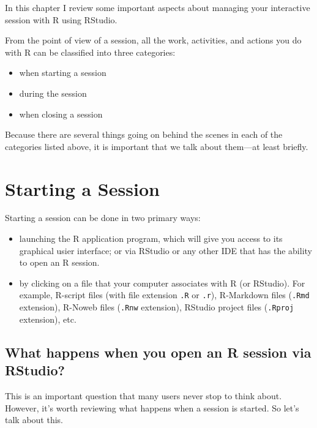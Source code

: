 \documentclass[
]{book}
\begin{document}
In this chapter I review some important aspects about managing your
interactive session with R using RStudio.

From the point of view of a session, all the work, activities, and actions you
do with R can be classified into three categories:

\begin{itemize}
\item
  when starting a session
\item
  during the session
\item
  when closing a session
\end{itemize}

Because there are several things going on behind the scenes in each of the
categories listed above, it is important that we talk about them---at least
briefly.

\hypertarget{starting-a-session}{%
\section{Starting a Session}\label{starting-a-session}}

Starting a session can be done in two primary ways:

\begin{itemize}
\item
  launching the R application program, which will give you access to its
  graphical usier interface; or via RStudio or any other IDE that has the
  ability to open an R session.
\item
  by clicking on a file that your computer associates with R (or RStudio).
  For example, R-script files (with file extension \texttt{.R} or \texttt{.r}), R-Markdown
  files (\texttt{.Rmd} extension), R-Noweb files (\texttt{.Rnw} extension), RStudio project
  files (\texttt{.Rproj} extension), etc.
\end{itemize}

\hypertarget{what-happens-when-you-open-an-r-session-via-rstudio}{%
\subsection{What happens when you open an R session via RStudio?}\label{what-happens-when-you-open-an-r-session-via-rstudio}}

This is an important question that many users never stop to think about.
However, it's worth reviewing what happens when a session is started. So let's
talk about this.
\end{document}

